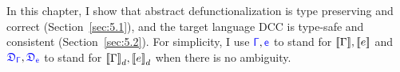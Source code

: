 
In this chapter, I show that abstract defunctionalization is type preserving and correct (Section~\ref{sec:5.1}), and the target language DCC is type-safe and consistent (Section~\ref{sec:5.2}). For simplicity, I use $\target{\Gamma}, \target{e}$ to stand for ${[\![ \Gamma ]\!]}, {[\![ e ]\!]}$ and $\target{\fdef_\Gamma}, \target{\fdef_e}$ to stand for ${[\![ \Gamma ]\!]}_d, {[\![ e ]\!]}_d$ when there is no ambiguity.






